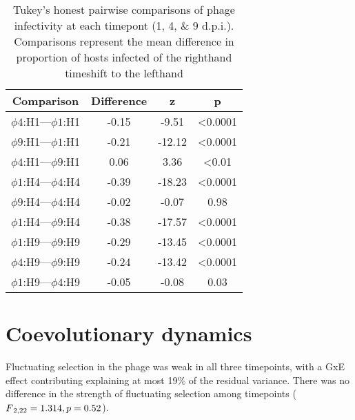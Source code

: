 \documentclass [12pt, a4paper, twoside]  {article}
\newcommand{\sub}{\textsubscript}
\begin{document}
\begin{table}[]
\begin{tabular}{c|c|c|c}
Comparison  	  &  Difference & z      & p                 \\
 \hline 
$\phi 4$:H1---$\phi 1$:H1 & -0.15 & -9.51 		 & \textless{}0.0001 \\
$\phi 9$:H1---$\phi 1$:H1 & -0.21 & -12.12 		 & \textless{}0.0001 \\
$\phi 4$:H1---$\phi 9$:H1 & 0.06   & 3.36      	 & \textless{}0.01   \\
\hline
$\phi 1$:H4---$\phi 4$:H4 & -0.39 & -18.23   	 & \textless{}0.0001 \\
$\phi 9$:H4---$\phi 4$:H4 & -0.02 & -0.07   		 & 0.98              \\
$\phi 1$:H4---$\phi 9$:H4 & -0.38  & -17.57     & \textless{}0.0001 \\
\hline
$\phi 1$:H9---$\phi 9$:H9 & -0.29  & -13.45     & \textless{}0.0001 \\
$\phi 4$:H9---$\phi 9$:H9 & -0.24 & -13.42     	 & \textless{}0.0001 \\
$\phi 1$:H9---$\phi 4$:H9 & -0.05 & -0.08        & 0.03             
\end{tabular}
\caption{Tukey's honest pairwise comparisons of phage infectivity at each timepont (1, 4, \& 9 d.p.i.). Comparisons represent the mean difference in proportion of hosts infected of the righthand timeshift to the lefthand }
\end{table}


\section*{Coevolutionary dynamics}
Fluctuating selection in the phage was weak in all three timepoints, with a GxE effect contributing explaining at most 19\% of the residual variance. There was no difference in the strength of fluctuating selection among timepoints ($F\sub{2,22} = 1.314, p = 0.52$). 


\clearpage

\end{document}
